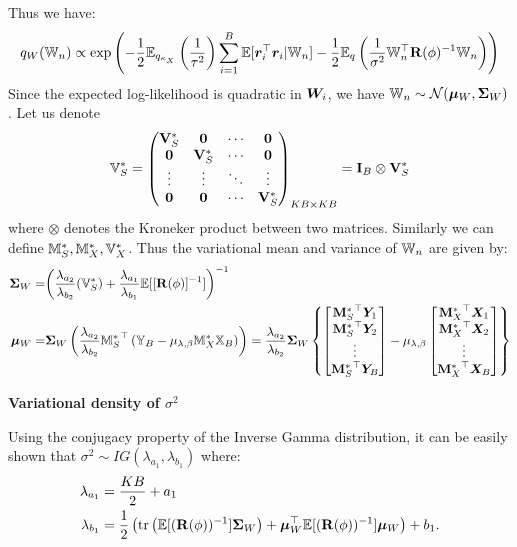 \documentclass[numsec,webpdf,modern,medium,namedate]{oup-authoring-template}
\theoremstyle{thmstyleone}%
\theoremstyle{thmstyletwo}%
\theoremstyle{thmstylethree}%
\begin{document}
Thus we have:
$$
q_W(\mathbb{W}_n) \propto \exp\left(-\frac{1}{2} \mathbb{E}_{q_{\kappa_X}}\left(\frac{1}{\tau^2}\right) \sum_{i=1}^B \mathbb{E}[\boldsymbol{r}_i^\top \boldsymbol{r}_i | \mathbb{W}_n] - \frac{1}{2} \mathbb{E}_q\left(\frac{1}{\sigma^2}\mathbb{W}_n^\top \mathbf{R}(\phi)^{-1} \mathbb{W}_n\right)\right)
$$
Since the expected log-likelihood is quadratic in \( \boldsymbol{W}_i \), we have $\mathbb{W}_n \sim \mathcal{N}(\boldsymbol{\mu}_{W}, \boldsymbol{\Sigma}_{W})$.
Let us denote 
$$
\mathbb{V}_S^\ast = \begin{pmatrix}
\mathbf{V}_S^\ast & \boldsymbol{0} & \cdots & \boldsymbol{0} \\
\boldsymbol{0} & \mathbf{V}_S^\ast & \cdots & \boldsymbol{0} \\
\vdots & \vdots & \ddots & \vdots \\
\boldsymbol{0} & \boldsymbol{0} & \cdots & \mathbf{V}_S^\ast
\end{pmatrix}_{KB \times KB} = \mathbf{I}_B \otimes \mathbf{V}_S^\ast
$$
where $\otimes$ denotes the Kroneker product between two matrices. Similarly we can define $\mathbb{M}_S^\ast,\mathbb{M}_X^\ast, \mathbb{V}_X^\ast$. Thus the variational mean and variance of $\mathbb{W}_n$ are given by:
\begin{equation*}
\begin{split}
    \boldsymbol{\Sigma}_{W} = & {\left({\dfrac{\lambda_{a_2}}{\lambda_{b_2}}} (\mathbb{V}^\ast_S) + \dfrac{\lambda_{a_1}}{\lambda_{b_1}} \mathbb{E}[[\mathbf{R}(\phi)]^{-1}] \right)^{-1}}\\
    \boldsymbol{\mu}_{W} = & \boldsymbol{\Sigma}_{W} \left( {{\dfrac{\lambda_{a_2}}{\lambda_{b_2}}} {\mathbb{M}^\ast_S}^\top}\left(\mathbb{Y}_B - \mu_{\lambda,\beta}\mathbb{M}^\ast_X \mathbb{X}_B\right) \right) = \dfrac{\lambda_{a_2}}{\lambda_{b_2}}\boldsymbol{\Sigma}_W\left\{\begin{bmatrix}
    {\mathbf{M}_S^\ast}^\top\boldsymbol{Y}_1\\
    {\mathbf{M}_S^\ast}^\top\boldsymbol{Y}_2\\
    \vdots\\
    {\mathbf{M}_S^\ast}^\top\boldsymbol{Y}_B\\
\end{bmatrix} - \mu_{\lambda,\beta}\begin{bmatrix}
    {\mathbf{M}_X^\ast}^\top\boldsymbol{X}_1\\
    {\mathbf{M}_X^\ast}^\top\boldsymbol{X}_2\\
    \vdots\\
    {\mathbf{M}_X^\ast}^\top\boldsymbol{X}_B\\
\end{bmatrix}\right\}
\end{split}
\end{equation*}

\textbf{Variational density of $\sigma^2$}

Using the conjugacy property of the Inverse Gamma distribution, it can be easily shown that $\sigma^2 \sim IG(\lambda_{a_1}, \lambda_{b_1})$ where:
\begin{align*}
\lambda_{a_1} &= \frac{KB}{2} + a_1 \\
\lambda_{b_1} &= \frac{1}{2} \left( \mathrm{tr}\left( \mathbb{E}[(\mathbf{R}(\phi))^{-1}] \boldsymbol{\Sigma}_W \right) + \boldsymbol{\mu}_W^{\top} \mathbb{E}[(\mathbf{R}(\phi))^{-1}] \boldsymbol{\mu}_W \right) + b_1 .
\end{align*}
\end{document}
